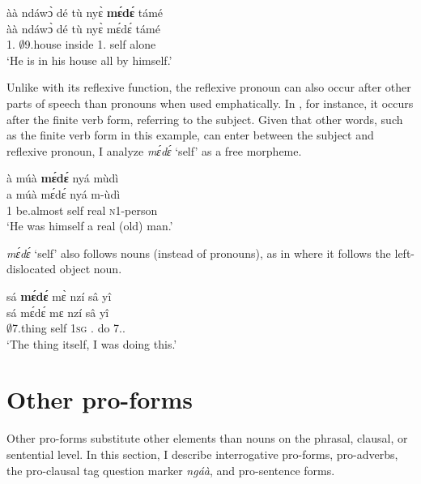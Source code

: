 \ea \label{mede2}
  \glll   àà ndáwɔ̀ dé tù nyɛ̀ {\bfseries mɛ́dɛ́} támé   \\
           àà ndáwɔ̀ dé tù nyɛ̀ mɛ́dɛ́ támé      \\
          1.{\COP} $\emptyset$9.house {\LOC} inside 1. {\SBJ} self alone \\
    \trans `He is in his house all by himself.'
\z

Unlike with its reflexive function, the reflexive pronoun can also occur after other parts of speech than pronouns when used emphatically. In , for instance, it occurs after the finite verb form, referring to the subject. Given that other words, such as the finite verb form in this example, can enter between the subject and reflexive pronoun, I analyze {\itshape mɛ́dɛ́} `self' as a free morpheme.

\ea \label{mede3}
  \glll  à múà {\bfseries mɛ́dɛ́} nyá mùdì \\
          a múà mɛ́dɛ́ nyá m-ùdì   \\
         1 be.almost self real \textsc{n}1-person    \\
    \trans `He was himself a real (old) man.'
\z


{\itshape mɛ́dɛ́} `self' also follows nouns (instead of pronouns), as in  where it follows the left-dislocated object noun.


\ea \label{mede4}
  \glll sá {\bfseries mɛ́dɛ́} mɛ̀ nzí sâ yî \\
        sá mɛ́dɛ́ mɛ nzí sâ yî \\
        $\emptyset$7.thing self 1\textsc{sg} {\PROG}.{\PST} do 7.{\DEM}.{\PROX} \\
    \trans `The thing itself, I was doing this.'
\z





















\section{Other pro-forms}
\label{sec:proform}

Other pro-forms substitute other elements than nouns on the phrasal, clausal, or sentential level. In this section, I describe interrogative pro-forms, pro-adverbs, the pro-clausal tag question marker {\itshape ngáà}, and pro-sentence forms.




